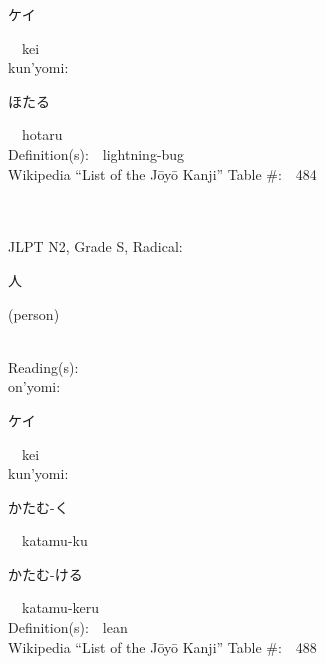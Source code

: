 \begin{multicols}{2}
{\hspace*{2em}}{\begin{CJK}{UTF8}{min} ケイ \end{CJK}}\ \ kei\ \ \\
{\hspace*{1em}}kun'yomi:\ \ \\
{\hspace*{2em}}{\begin{CJK}{UTF8}{min} ほたる \end{CJK}}\ \ hotaru\ \ \\
Definition(s):\ \ lightning-bug \\
Wikipedia ``List of the J\=oy\=o Kanji'' Table \#:\ \ 484 \\
\ \ \\
{\fontsize{34pt}{40pt}  }\ \ \\  %
{JLPT N2, Grade S, Radical:\ \ {\begin{CJK}{UTF8}{min} 人 \end{CJK}} (person) } \\
Reading(s):\ \ \\
{\hspace*{1em}}on'yomi:\ \ \\
{\hspace*{2em}}{\begin{CJK}{UTF8}{min} ケイ \end{CJK}}\ \ kei\ \ \\
{\hspace*{1em}}kun'yomi:\ \ \\
{\hspace*{2em}}{\begin{CJK}{UTF8}{min} かたむ-く \end{CJK}}\ \ katamu-ku\ \ \\
{\hspace*{2em}}{\begin{CJK}{UTF8}{min} かたむ-ける \end{CJK}}\ \ katamu-keru\ \ \\
Definition(s):\ \ lean \\
Wikipedia ``List of the J\=oy\=o Kanji'' Table \#:\ \ 488 \\
\ \ \\
{\fontsize{34pt}{40pt}  }\ \ \\

\end{multicols}
